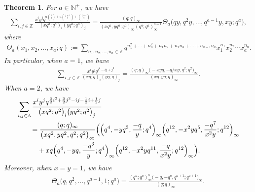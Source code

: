 \documentclass[10pt,a4paper]{amsart}
\numberwithin{equation}{section}
\newtheorem{Theorem}{Theorem}[section]
\theoremstyle{definition}
\begin{document}
\begin{Theorem}\label{main-theorem}
 For $a\in\mathbb{N^+}$, we have
 \begin{align}\label{main-result-a}
 \sum_{i,j\in \mathbb{Z}}\frac{x^iy^jq^{a\binom{i}{2}+a\binom{j+1}{2}+\binom{j-i}{2}}}{(xq^a;q^a)_i(yq^a;q^a)_j} =\frac{(q;q)_{\infty}}{(xq^a,yq^a;q^a)_{\infty}(q^a;q^a)_{\infty}^{a-1}}\Theta_a\bigl(qy,q^2y,\dots,q^{a-1}y,xy;q^a\bigr),\!\!\!
 \end{align}
 where
\begin{align*}
\Theta_a(x_1,x_2,\dots,x_a;q):=\sum_{n_1,n_2,\dots,n_a\in \mathbb{Z}}q^{n_1^2+\cdots+n_a^2+n_1n_2+n_1n_3+\cdots+n_{a-1}n_a}x_1^{n_1}x_2^{n_2}\cdots x_a^{n_a}.
\end{align*}
In particular, when $a=1$, we have
\begin{align}\label{main-result-1}
 \sum_{i,j \in \mathbb{Z}} \frac{x^i y^j q^{i^2 - ij + j^2}}{(xq; q)_i (yq; q)_j} = \frac{(q; q)_{\infty} \bigl(-xyq, -q/xy, q^2; q^2\bigr)_{\infty}}{(xq, yq; q)_{\infty}}.
\end{align}
When $a=2$, we have
\begin{align}
 &\sum_{i,j\in\mathbb{Z}}\frac{x^iy^jq^{\frac{3}{2}i^2+\frac{3}{2}j^2-ij-\frac{1}{2}i +\frac{1}{2}j}}{\bigl(xq^2;q^2\bigr)_i\bigl(yq^2;q^2\bigr)_j}\nonumber\\
 & \qquad =\frac{(q;q)_{\infty}}{\bigl(xq^2,yq^2,q^2;q^2\bigr)_{\infty}} \Bigl(\Bigl(q^4,-yq^3,\frac{-q}{y};q^4\Bigr)_{\infty}\Bigl(q^{12},-x^2yq^5,\frac{-q^7}{x^2y};q^{12}\Bigr)_{\infty}\nonumber\\
 &\qquad \quad {}+xq\Bigl(q^4,-yq,\frac{-q^3}{y};q^4\Bigr)_{\infty}\Bigl(q^{12},-x^2yq^{11},\frac{-q}{x^2y};q^{12}\Bigr)_{\infty}\Bigr).\label{main-result-2}
\end{align}
Moreover, when $x=y=1$, we have
\begin{align}\label{main-result-3}
\Theta_a\bigl(q,q^2,\dots,q^{a-1},1;q^a\bigr) =\frac{(q^a;q^a)^a_{\infty}\bigl(-q,-q^a,q^{a+1};q^{a+1}\bigr)_{\infty}}{(q;q)_{\infty}}.
\end{align}
\end{Theorem}
\end{document}
